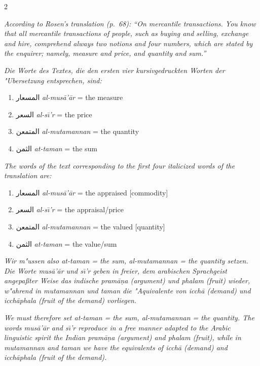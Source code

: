 \documentclass[10pt,a4paper]{article}
\newcommand{\RL}[1]{\beginR#1\endR}
\newcommand{\ar}[1]{{\arabicfont\RL{#1}}}
\newcommand{\enquote}[1]{``#1''}
\begin{document}
\begin{paracol}{2}
\switchcolumn

\textit{According to Rosen's translation (p.\ 68): \enquote{On mercantile transactions. You know that all mercantile transactions of people, such as buying and selling, exchange and hire, comprehend always two notions and four numbers, which are stated by the enquirer; namely, measure and price, and quantity and sum.}}

\switchcolumn*

\textit{Die Worte des Textes, die den ersten vier kursivgedruckten Worten der "Ubersetzung entsprechen, sind:}
\begin{enumerate}
\item \ar{المسعار} \textit{al-mus\=a'\=ar} = the measure
\item \ar{السعر} \textit{al-s\=\i'r} = the price
\item \ar{المتمعن} \textit{al-mutamannan} = the quantity
\item \ar{الثمن} \textit{at-taman} = the sum
\end{enumerate}

\switchcolumn

\textit{The words of the text corresponding to the first four italicized words of the translation are:}
\begin{enumerate}
\item \ar{المسعار} \textit{al-mus\=a'\=ar} = the appraised [commodity]
\item \ar{السعر} \textit{al-s\=\i'r} = the appraisal/price
\item \ar{المتمعن} \textit{al-mutamannan} = the valued [quantity]
\item \ar{الثمن} \textit{at-taman} = the value/sum
\end{enumerate}

\switchcolumn*

\textit{Wir m"ussen also \textit{at-taman} = the sum, \textit{al-mutamannan} = the quantity setzen. Die Worte \textit{mus\=a'\=ar} und \textit{s\=\i'r} geben in freier, dem arabischen Sprachgeist angepa\ss{}ter Weise das indische \textit{pram\=a\d{n}a} (argument) und \textit{phalam} (fruit) wieder, w"ahrend in \textit{mutamannan} und \textit{taman} die "Aquivalente von \textit{icch\=a} (demand) und \textit{icch\=aphala} (fruit of the demand) vorliegen.}

\switchcolumn

\textit{We must therefore set \textit{at-taman} = the sum, \textit{al-mutamannan} = the quantity. The words \textit{mus\=a'\=ar} and \textit{s\=\i'r} reproduce in a free manner adapted to the Arabic linguistic spirit the Indian \textit{pram\=a\d{n}a} (argument) and \textit{phalam} (fruit), while in \textit{mutamannan} and \textit{taman} we have the equivalents of \textit{icch\=a} (demand) and \textit{icch\=aphala} (fruit of the demand).}


\end{paracol}
\end{document}
